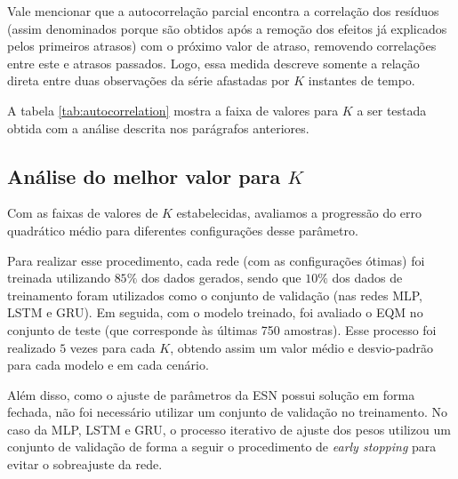 \documentclass[a4paper, 12pt]{article}
\begin{document}
Vale mencionar que a autocorrelação parcial encontra a correlação dos resíduos (assim denominados porque são obtidos após a remoção dos efeitos já explicados pelos primeiros atrasos) com o próximo valor de atraso, removendo correlações entre este e atrasos passados. Logo, essa medida descreve somente a relação direta entre duas observações da série afastadas por $K$ instantes de tempo.

A tabela \ref{tab:autocorrelation} mostra a faixa de valores para $K$ a ser testada obtida com a análise descrita nos parágrafos anteriores.
\begin{table}[H]
\begin{center}
\caption{Faixa de valores inteiros para $K$ a ser testada em cada cenário para todas as redes.}
\label{tab:autocorrelation}
\end{center}
\end{table}

\subsection{Análise do melhor valor para $K$}

Com as faixas de valores de $K$ estabelecidas, avaliamos a progressão do erro quadrático médio para diferentes configurações desse parâmetro.

Para realizar esse procedimento, cada rede (com as configurações ótimas) foi treinada utilizando $85\%$ dos dados gerados, sendo que $10\%$ dos dados de treinamento foram utilizados como o conjunto de validação (nas redes MLP, LSTM e GRU). Em seguida, com o modelo treinado, foi avaliado o EQM no conjunto de teste (que corresponde às últimas 750 amostras). Esse processo foi realizado $5$ vezes para cada $K$, obtendo assim um valor médio e desvio-padrão para cada modelo e em cada cenário. 

Além disso, como o ajuste de parâmetros da ESN possui solução em forma fechada, não foi necessário utilizar um conjunto de validação no treinamento. No caso da MLP, LSTM e GRU, o processo iterativo de ajuste dos pesos utilizou um conjunto de validação de forma a seguir o procedimento de \textit{early stopping} para evitar o sobreajuste da rede.
\end{document}
